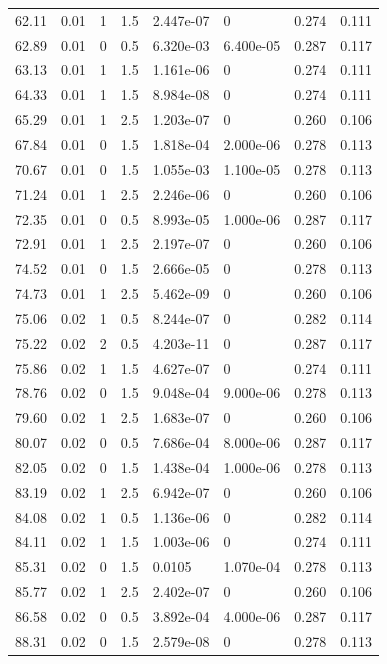 \documentclass[preview]{standalone}
\begin{document}
{{{\begin{tabular}{L{1.2cm}C{1.2cm} C{0.3cm}C{0.5cm} C{1.4cm}C{1.4cm} C{1.4cm}C{1.4cm}}
  62.11  &  0.01  & 1     & 1.5 &  2.447e-07  & 0  & 0.274 &  0.111   \\ 
  62.89  &  0.01  & 0     & 0.5 &  6.320e-03  & 6.400e-05  & 0.287 &  0.117   \\ 
  63.13  &  0.01  & 1     & 1.5 &  1.161e-06  & 0  & 0.274 &  0.111   \\ 
  64.33  &  0.01  & 1     & 1.5 &  8.984e-08  & 0  & 0.274 &  0.111   \\ 
  65.29  &  0.01  & 1     & 2.5 &  1.203e-07  & 0  & 0.260 &  0.106   \\ 
  67.84  &  0.01  & 0     & 1.5 &  1.818e-04  & 2.000e-06  & 0.278 &  0.113   \\ 
  70.67  &  0.01  & 0     & 1.5 &  1.055e-03  & 1.100e-05  & 0.278 &  0.113   \\ 
  71.24  &  0.01  & 1     & 2.5 &  2.246e-06  & 0  & 0.260 &  0.106   \\ 
  72.35  &  0.01  & 0     & 0.5 &  8.993e-05  & 1.000e-06  & 0.287 &  0.117   \\ 
  72.91  &  0.01  & 1     & 2.5 &  2.197e-07  & 0  & 0.260 &  0.106   \\ 
  74.52  &  0.01  & 0     & 1.5 &  2.666e-05  & 0  & 0.278 &  0.113   \\ 
  74.73  &  0.01  & 1     & 2.5 &  5.462e-09  & 0  & 0.260 &  0.106   \\ 
  75.06  &  0.02  & 1     & 0.5 &  8.244e-07  & 0  & 0.282 &  0.114   \\ 
  75.22  &  0.02  & 2     & 0.5 &  4.203e-11  & 0  & 0.287 &  0.117   \\ 
  75.86  &  0.02  & 1     & 1.5 &  4.627e-07  & 0  & 0.274 &  0.111   \\ 
  78.76  &  0.02  & 0     & 1.5 &  9.048e-04  & 9.000e-06  & 0.278 &  0.113   \\ 
  79.60  &  0.02  & 1     & 2.5 &  1.683e-07  & 0  & 0.260 &  0.106   \\ 
  80.07  &  0.02  & 0     & 0.5 &  7.686e-04  & 8.000e-06  & 0.287 &  0.117   \\ 
  82.05  &  0.02  & 0     & 1.5 &  1.438e-04  & 1.000e-06  & 0.278 &  0.113   \\ 
  83.19  &  0.02  & 1     & 2.5 &  6.942e-07  & 0  & 0.260 &  0.106   \\ 
  84.08  &  0.02  & 1     & 0.5 &  1.136e-06  & 0  & 0.282 &  0.114   \\ 
  84.11  &  0.02  & 1     & 1.5 &  1.003e-06  & 0  & 0.274 &  0.111   \\ 
  85.31  &  0.02  & 0     & 1.5 &  0.0105  & 1.070e-04  & 0.278 &  0.113   \\ 
  85.77  &  0.02  & 1     & 2.5 &  2.402e-07  & 0  & 0.260 &  0.106   \\ 
  86.58  &  0.02  & 0     & 0.5 &  3.892e-04  & 4.000e-06  & 0.287 &  0.117   \\ 
  88.31  &  0.02  & 0     & 1.5 &  2.579e-08  & 0  & 0.278 &  0.113   \\ 
\hline 
\end{tabular} 

}}}
\end{document}
